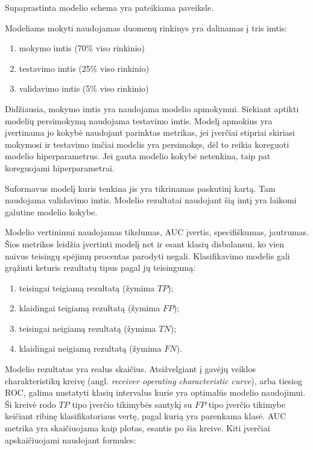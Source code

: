 
Supaprastinta modelio schema yra pateikiama  paveiksle.

Modeliams mokyti naudojamas duomenų rinkinys yra dalinamas į tris imtis:
\begin{enumerate}
    \item mokymo imtis (70\% viso rinkinio)
    \item testavimo imtis (25\% viso rinkinio)
    \item validavimo imtis (5\% viso rinkinio)
\end{enumerate}
Didžiausia, mokymo imtis yra naudojama modelio apmokymui. Siekiant aptikti modelių persimokymą naudojama
testavimo imtis. Modelį apmokius yra įvertinama jo kokybė naudojant parinktas metrikas, jei įverčiai stipriai
skiriasi mokymosi ir testavimo imčiai modelis yra persimokęs, dėl to reikia koreguoti modelio hiperparametrus.
Jei gauta modelio kokybė netenkina,  taip pat koreguojami hiperparametrai.

Suformavus modelį kuris tenkina jis yra tikrinamas paskutinį kartą. Tam naudojama validavimo imtis.
Modelio rezultatai naudojant šią imtį yra laikomi galutine modelio kokybe.


Modelio vertinimui naudojamas tikslumas, AUC įvertis, specifiškumas, jautrumas. Šios metrikos leidžia
 įvertinti modelį net ir esant klasių disbalansui, ko vien naivus teisingų spėjimų procentas parodyti
  negali. Klasifikavimo modelis gali grąžinti keturis rezultatų tipus pagal jų teisingumą:
\begin{enumerate}
    \item teisingai teigiamą rezultatą (žymima $TP$);
    \item klaidingai teigiamą rezultatą (žymima $FP$);
    \item teisingai neigiamą rezultatą (žymima $TN$);
    \item klaidingai neigiamą rezultatą (žymima $FN$).
\end{enumerate}

 Modelio rezultatas yra realus skaičius. Atsižvelgiant į gavėjų veiklos charakteristikų kreivę
(angl. \textit{receiver operating characteristic curve}), arba tiesiog ROC, galima nustatyti
klasių intervalus kurie yra optimalūs modelio naudojimui. Ši kreivė rodo $TP$ tipo įverčio
tikimybės santykį su $FP$ tipo įverčio tikimybe keičiant ribinę klasifikatoriaus vertę, pagal
kurią yra parenkama klasė. AUC metrika yra skaičiuojama kaip plotas, esantis po šia kreive.
Kiti įverčiai apskaičiuojami naudojant formules:

